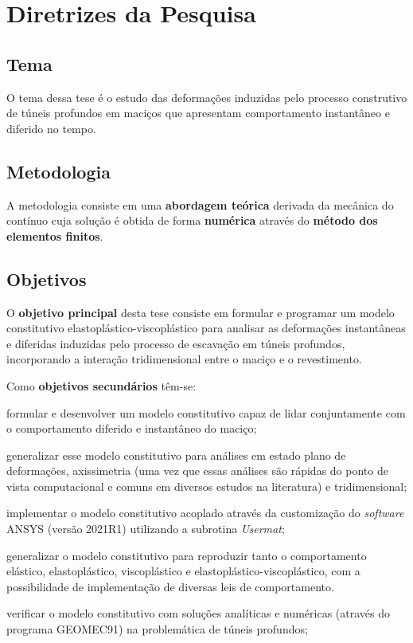 \chapter{Diretrizes da Pesquisa}

\section{Tema}

O tema dessa tese é o estudo das deformações induzidas pelo processo construtivo de túneis profundos em maciços que apresentam comportamento instantâneo e diferido no tempo.

\section{Metodologia}

A metodologia consiste em uma \textbf{abordagem teórica} derivada da mecânica do contínuo cuja solução é obtida de forma \textbf{numérica} através do \textbf{método dos elementos finitos}.

\section{Objetivos}

O \textbf{objetivo principal} desta tese consiste em formular e programar um modelo constitutivo elastoplástico-viscoplástico para analisar as deformações instantâneas e diferidas induzidas pelo processo de escavação em túneis profundos, incorporando a interação tridimensional entre o maciço e o revestimento.

Como \textbf{objetivos secundários} têm-se:

\begin{alineas}
	 

	\item formular e desenvolver um modelo constitutivo capaz de lidar conjuntamente com o comportamento diferido e instantâneo do maciço;
	
	\item generalizar esse modelo constitutivo para análises em estado plano de deformações, axissimetria (uma vez que essas análises são rápidas do ponto de vista computacional e comuns em diversos estudos na literatura) e tridimensional;
	
	\item implementar o modelo constitutivo acoplado através da customização do \textit{software} ANSYS (versão 2021R1) utilizando a subrotina \textit{Usermat};
	
	\item generalizar o modelo constitutivo para reproduzir tanto o comportamento elástico, elastoplástico, viscoplástico e elastoplástico-viscoplástico, com a possibilidade de implementação de diversas leis de comportamento.
	
	\item verificar o modelo constitutivo com soluções analíticas e numéricas (através do programa GEOMEC91) na problemática de túneis profundos;
	
\end{alineas}

